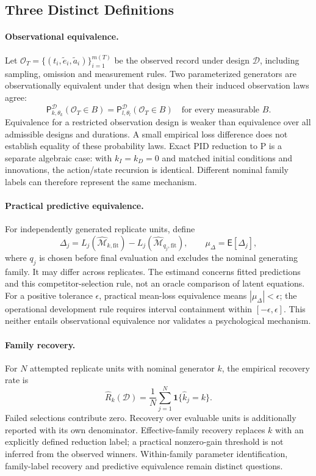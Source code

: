 \subsection{Three Distinct Definitions}

\paragraph{Observational equivalence.}
Let $\mathcal O_T=\{(t_i,\widetilde e_i,\widetilde a_i)\}_{i=1}^{m(T)}$ be the observed record under design $\mathcal D$, including sampling, omission and measurement rules. Two parameterized generators are observationally equivalent under that design when their induced observation laws agree:
\[
\mathsf P^{\mathcal D}_{k,\theta_k}(\mathcal O_T\in B)
=\mathsf P^{\mathcal D}_{l,\theta_l}(\mathcal O_T\in B)
\quad\text{for every measurable }B.
\]
Equivalence for a restricted observation design is weaker than equivalence over all admissible designs and durations. A small empirical loss difference does not establish equality of these probability laws. Exact PID reduction to P is a separate algebraic case: with $k_I=k_D=0$ and matched initial conditions and innovations, the action/state recursion is identical. Different nominal family labels can therefore represent the same mechanism.

\paragraph{Practical predictive equivalence.}
For independently generated replicate units, define
\[
\Delta_j=L_j(\widehat{\mathcal M}_{k,\mathrm{fit}})
-L_j(\widehat{\mathcal M}_{q_j,\mathrm{fit}}),
\qquad \mu_\Delta=\mathsf E[\Delta_j],
\]
where $q_j$ is chosen before final evaluation and excludes the nominal generating family. It may differ across replicates. The estimand concerns fitted predictions and this competitor-selection rule, not an oracle comparison of latent equations. For a positive tolerance $\epsilon$, practical mean-loss equivalence means $|\mu_\Delta|<\epsilon$; the operational development rule requires interval containment within $[-\epsilon,\epsilon]$. This neither entails observational equivalence nor validates a psychological mechanism.

\paragraph{Family recovery.}
For $N$ attempted replicate units with nominal generator $k$, the empirical recovery rate is
\[
\widehat R_k(\mathcal D)=\frac{1}{N}\sum_{j=1}^{N}
\mathbf 1\{\widehat k_j=k\}.
\]
Failed selections contribute zero. Recovery over evaluable units is additionally reported with its own denominator. Effective-family recovery replaces $k$ with an explicitly defined reduction label; a practical nonzero-gain threshold is not inferred from the observed winners. Within-family parameter identification, family-label recovery and predictive equivalence remain distinct questions.
